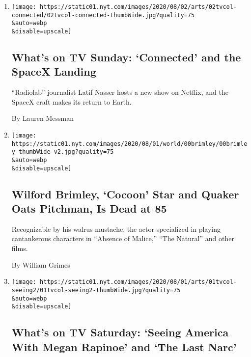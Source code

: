 \begin{enumerate}
\def\labelenumi{\arabic{enumi}.}
\item
  \href{/2020/08/02/arts/television/whats-on-tv-sunday-connected-and-the-spacex-landing.html}{}

  \texttt{[image: https://static01.nyt.com/images/2020/08/02/arts/02tvcol-connected/02tvcol-connected-thumbWide.jpg?quality=75\\\&auto=webp\\\&disable=upscale]}

  \hypertarget{whats-on-tv-sunday-connected-and-the-spacex-landing}{%
  \subsection{What's on TV Sunday: `Connected' and the SpaceX
  Landing}\label{whats-on-tv-sunday-connected-and-the-spacex-landing}}

  ``Radiolab'' journalist Latif Nasser hosts a new show on Netflix, and
  the SpaceX craft makes its return to Earth.

  By Lauren Messman
\item
  \href{/2020/08/01/obituaries/wilford-brimley-dead.html}{}

  \texttt{[image: https://static01.nyt.com/images/2020/08/01/world/00brimley/00brimley-thumbWide-v2.jpg?quality=75\\\&auto=webp\\\&disable=upscale]}

  \hypertarget{wilford-brimley-cocoon-star-and-quaker-oats-pitchman-is-dead-at-85}{%
  \subsection{Wilford Brimley, `Cocoon' Star and Quaker Oats Pitchman,
  Is Dead at
  85}\label{wilford-brimley-cocoon-star-and-quaker-oats-pitchman-is-dead-at-85}}

  Recognizable by his walrus mustache, the actor specialized in playing
  cantankerous characters in ``Absence of Malice,'' ``The Natural'' and
  other films.

  By William Grimes
\item
  \href{/2020/08/01/arts/television/whats-on-tv-saturday-seeing-america-with-megan-rapinoe-and-the-last-narc.html}{}

  \texttt{[image: https://static01.nyt.com/images/2020/08/01/arts/01tvcol-seeing2/01tvcol-seeing2-thumbWide.jpg?quality=75\\\&auto=webp\\\&disable=upscale]}

  \hypertarget{whats-on-tv-saturday-seeing-america-with-megan-rapinoe-and-the-last-narc}{%
  \subsection{What's on TV Saturday: `Seeing America With Megan Rapinoe'
  and `The Last
  Narc'}\label{whats-on-tv-saturday-seeing-america-with-megan-rapinoe-and-the-last-narc}}


\end{enumerate}

